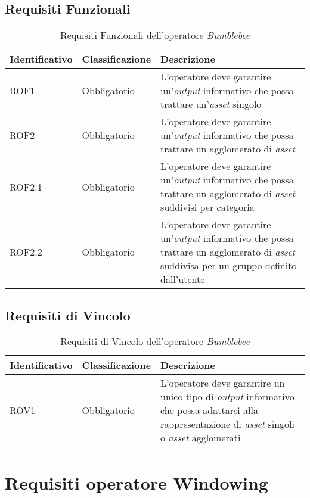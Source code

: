 \subsection{Requisiti Funzionali}
{
\centering
\begin{longtable}{L{3cm} L{3cm} L{7.5cm}}
\caption{Requisiti Funzionali dell'operatore \textit{Bumblebee}}\\
\textbf{Identificativo} &
\textbf{Classificazione}&
\textbf{Descrizione}\\
\endhead
\hline

ROF1 & Obbligatorio & L'operatore deve garantire un'\textit{output} informativo che possa trattare un'\textit{asset} singolo\\
\hline
ROF2 & Obbligatorio & L'operatore deve garantire un'\textit{output} informativo che possa trattare un agglomerato di \textit{asset}\\
\hline
ROF2.1 & Obbligatorio & L'operatore deve garantire un'\textit{output} informativo che possa trattare un agglomerato di \textit{asset} suddivisi per categoria\\
\hline
ROF2.2 & Obbligatorio & L'operatore deve garantire un'\textit{output} informativo che possa trattare un agglomerato di \textit{asset} suddivisa per un gruppo definito dall'utente\\
\hline
\end{longtable}
}

\subsection{Requisiti di Vincolo}
{
\centering
\begin{longtable}{L{3cm} L{3cm} L{7.5cm}}
\caption{Requisiti di Vincolo dell'operatore \textit{Bumblebee}}\\
\textbf{Identificativo} &
\textbf{Classificazione}&
\textbf{Descrizione}\\
\endhead
\hline

ROV1 & Obbligatorio & L'operatore deve garantire un unico tipo di \textit{output} informativo che possa adattarsi alla rappresentazione di \textit{asset} singoli o \textit{asset} agglomerati\\
\hline
\end{longtable}
}





\section{Requisiti operatore Windowing}
